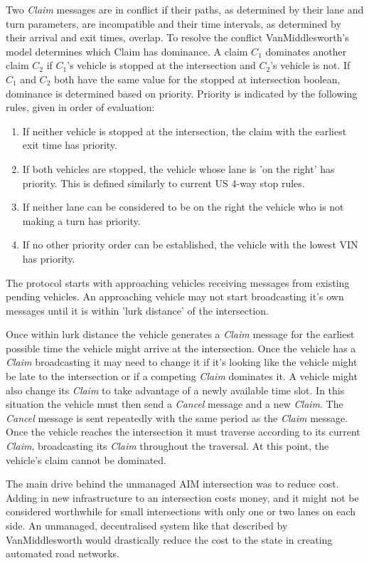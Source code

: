 Two \emph{Claim} messages are in conflict if their paths, as determined by their lane and turn parameters, are incompatible and their time intervals, as determined by their arrival and exit times, overlap. To resolve the conflict VanMiddlesworth's model determines which Claim has dominance. A claim $C_1$ dominates another claim $C_2$ if $C_1$'s vehicle is stopped at the intersection and $C_2$'s vehicle is not. If $C_1$ and $C_2$ both have the same value for the stopped at intersection boolean, dominance is determined based on priority. Priority is indicated by the following rules, given in order of evaluation:
\begin{enumerate}
\item If neither vehicle is stopped at the intersection, the claim with the earliest exit time has priority.
\item If both vehicles are stopped, the vehicle whose lane is 'on the right' has priority. This is defined similarly to current US 4-way stop rules.
\item If neither lane can be considered to be on the right the vehicle who is not making a turn has priority.
\item If no other priority order can be established, the vehicle with the lowest VIN has priority.
\end{enumerate}

The protocol starts with approaching vehicles receiving messages from existing pending vehicles. An approaching vehicle may not start broadcasting it's own messages until it is within 'lurk distance' of the intersection. 

Once within lurk distance the vehicle generates a \emph{Claim} message for the earliest possible time the vehicle might arrive at the intersection. Once the vehicle has a \emph{Claim} broadcasting it may need to change it if it's looking like the vehicle might be late to the intersection or if a competing \emph{Claim} dominates it. A vehicle might also change its \emph{Claim} to take advantage of a newly available time slot. In this situation the vehicle must then send a \emph{Cancel} message and a new \emph{Claim}. The \emph{Cancel} message is sent repeatedly with the same period as the \emph{Claim} message. Once the vehicle reaches the intersection it must traverse according to its current \emph{Claim}, broadcasting its \emph{Claim} throughout the traversal. At this point, the vehicle's claim cannot be dominated.

The main drive behind the unmanaged AIM intersection was to reduce cost. Adding in new infrastructure to an intersection costs money, and it might not be considered worthwhile for small intersections with only one or two lanes on each side. An unmanaged, decentralised system like that described by VanMiddlesworth would drastically reduce the cost to the state in creating automated road networks.

